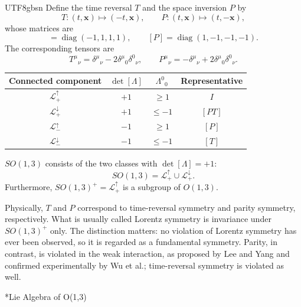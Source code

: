 \documentclass[11pt,a4paper,oneside]{report}
\makeatletter
\newcommand\topic{\@startsection{paragraph}{4}{\z@}{-1.7ex plus -.3ex}{.5ex}{\normalfont\normalsize\bfseries\itshape\boldmath}*}
\makeatother
\begin{document}
\begin{CJK*}{UTF8}{gbsn}
Define the time reversal $T$ and the space inversion $P$ by
\begin{equation*}
T:(t,\mathbf x)\mapsto(-t,\mathbf x),\qquad
P:(t,\mathbf x)\mapsto(t,-\mathbf x),
\tag{B.25}\label{eq:B.25}
\end{equation*}
whose matrices are
\begin{equation*}
[T]=\operatorname{diag}(-1,1,1,1),\qquad
[P]=\operatorname{diag}(1,-1,-1,-1).
\tag{B.26}\label{eq:B.26}
\end{equation*}
The corresponding tensors are
\begin{equation*}
T^\mu{}_\nu=\delta^\mu{}_\nu-2\delta^\mu{}_0\delta^0{}_\nu,\qquad
P^\mu{}_\nu=-\delta^\mu{}_\nu+2\delta^\mu{}_0\delta^0{}_\nu.
\tag{B.27}\label{eq:B.27}
\end{equation*}

\begin{center}
\renewcommand{\arraystretch}{1.2}
\begin{tabular}{cccc}
\toprule
Connected component & $\det[\Lambda]$ & $\Lambda^0{}_0$ & Representative \\
\midrule
$\mathcal L^\uparrow_+$ & $+1$ & $\ge1$ & $I$ \\
$\mathcal L^\downarrow_+$ & $+1$ & $\le-1$ & $[PT]$ \\
$\mathcal L^\uparrow_-$ & $-1$ & $\ge1$ & $[P]$ \\
$\mathcal L^\downarrow_-$ & $-1$ & $\le-1$ & $[T]$ \\
\bottomrule
\end{tabular}
\end{center}

$SO(1,3)$ consists of the two classes with $\det[\Lambda]=+1$:
\begin{equation*}
SO(1,3)=\mathcal L^\uparrow_+\cup\mathcal L^\downarrow_+.
\tag{B.28}\label{eq:B.28}
\end{equation*}
Furthermore, $SO(1,3)^+=\mathcal L^\uparrow_+$ is a subgroup of $O(1,3)$.

Physically, $T$ and $P$ correspond to time-reversal symmetry and parity symmetry, respectively. What is usually called Lorentz symmetry is invariance under $SO(1,3)^+$ only. The distinction matters: no violation of Lorentz symmetry has ever been observed, so it is regarded as a fundamental symmetry. Parity, in contrast, is violated in the weak interaction, as proposed by Lee and Yang and confirmed experimentally by Wu et al.; time-reversal symmetry is violated as well.

\topic{Lie Algebra of O(1,3)}


\end{CJK*}
\end{document}
